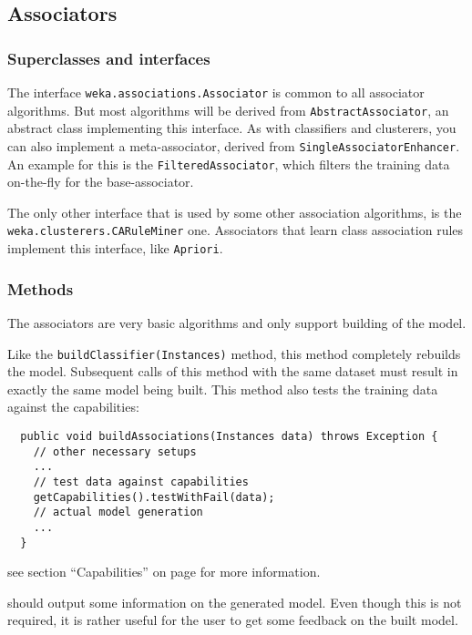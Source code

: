 
\newpage
\subsection{Associators}
\subsubsection*{Superclasses and interfaces}
The interface \texttt{weka.associations.Associator} is common to all associator
algorithms. But most algorithms will be derived from
\texttt{AbstractAssociator}, an abstract class implementing this interface.
As with classifiers and clusterers, you can also implement a meta-associator,
derived from \texttt{SingleAssociatorEnhancer}. An example for this is the
\texttt{FilteredAssociator}, which filters the training data on-the-fly for the
base-associator.

The only other interface that is used by some other association algorithms, is
the \texttt{weka.clusterers.CARuleMiner} one. Associators that learn class
association rules implement this interface, like \texttt{Apriori}.

\subsubsection*{Methods}
The associators are very basic algorithms and only support building of the
model.

Like the \texttt{buildClassifier(Instances)} method, this method completely
rebuilds the model. Subsequent calls of this method with the same dataset must
result in exactly the same model being built. This method also tests the
training data against the capabilities:
\begin{verbatim}
  public void buildAssociations(Instances data) throws Exception {
    // other necessary setups
    ...
    // test data against capabilities
    getCapabilities().testWithFail(data);
    // actual model generation
    ...
  }
\end{verbatim}

see section ``Capabilities'' on page \pageref{classifier_capabilities} for more
information.

should output some information on the generated model. Even though this is not
required, it is rather useful for the user to get some feedback on the built
model.

